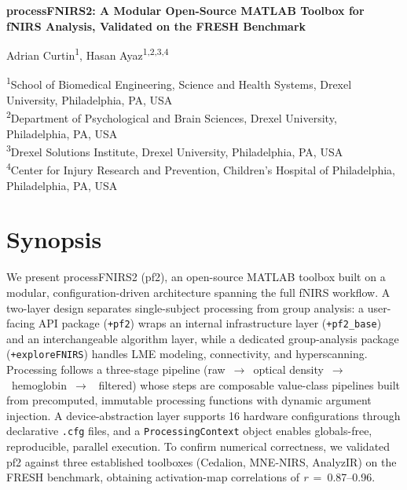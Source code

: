 \documentclass[11pt]{article}
\begin{document}
\begin{center}
{\fontsize{14}{17}\selectfont\bfseries\color{headblue}%
processFNIRS2: A Modular Open-Source MATLAB Toolbox for fNIRS Analysis, Validated on the FRESH Benchmark}

\vspace{6pt}

Adrian Curtin\textsuperscript{1}, Hasan Ayaz\textsuperscript{1,2,3,4}

\vspace{3pt}

{\fontsize{11}{13}\selectfont
\textsuperscript{1}School of Biomedical Engineering, Science and Health Systems, Drexel University, Philadelphia, PA, USA\\
\textsuperscript{2}Department of Psychological and Brain Sciences, Drexel University, Philadelphia, PA, USA\\
\textsuperscript{3}Drexel Solutions Institute, Drexel University, Philadelphia, PA, USA\\
\textsuperscript{4}Center for Injury Research and Prevention, Children's Hospital of Philadelphia, Philadelphia, PA, USA}
\end{center}

\section*{Synopsis}

We present processFNIRS2 (pf2), an open-source MATLAB toolbox built on a
modular, configuration-driven architecture spanning the full fNIRS workflow.
A two-layer design separates single-subject processing from group analysis: a
user-facing API package (\texttt{+pf2}) wraps an internal infrastructure layer
(\texttt{+pf2\_base}) and an interchangeable algorithm layer, while a dedicated
group-analysis package (\texttt{+exploreFNIRS}) handles LME modeling,
connectivity, and hyperscanning. Processing follows a three-stage pipeline
(raw~$\rightarrow$~optical density~$\rightarrow$~hemoglobin~$\rightarrow$
~filtered) whose steps are composable value-class pipelines built from
precomputed, immutable processing functions with dynamic argument injection. A
device-abstraction layer supports 16 hardware configurations through
declarative \texttt{.cfg} files, and a \texttt{ProcessingContext} object
enables globals-free, reproducible, parallel execution. To confirm numerical
correctness, we validated pf2 against three established toolboxes (Cedalion,
MNE-NIRS, AnalyzIR) on the FRESH benchmark, obtaining activation-map
correlations of \textit{r}~=~0.87--0.96.
\end{document}
